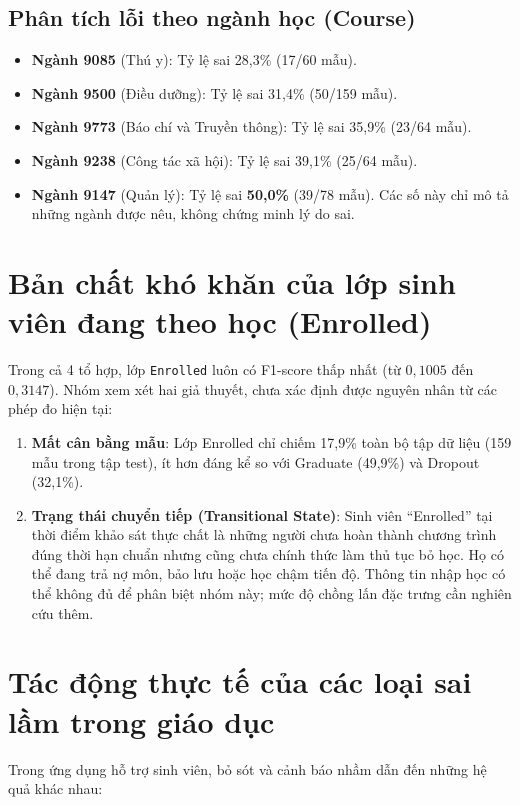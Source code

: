 \subsection{Phân tích lỗi theo ngành học (Course)}
\begin{itemize}
    \item \textbf{Ngành 9085} (Thú y): Tỷ lệ sai 28,3\% (17/60 mẫu).
    \item \textbf{Ngành 9500} (Điều dưỡng): Tỷ lệ sai 31,4\% (50/159 mẫu). 
    \item \textbf{Ngành 9773} (Báo chí và Truyền thông): Tỷ lệ sai 35,9\% (23/64 mẫu).
    \item \textbf{Ngành 9238} (Công tác xã hội): Tỷ lệ sai 39,1\% (25/64 mẫu).
    \item \textbf{Ngành 9147} (Quản lý): Tỷ lệ sai \textbf{50,0\%} (39/78 mẫu). Các số này chỉ mô tả những ngành được nêu, không chứng minh lý do sai.
\end{itemize}

\section{Bản chất khó khăn của lớp sinh viên đang theo học (Enrolled)}
Trong cả 4 tổ hợp, lớp \texttt{Enrolled} luôn có F1-score thấp nhất (từ $0{,}1005$ đến $0{,}3147$). Nhóm xem xét hai giả thuyết, chưa xác định được nguyên nhân từ các phép đo hiện tại:
\begin{enumerate}
    \item \textbf{Mất cân bằng mẫu}: Lớp Enrolled chỉ chiếm 17,9\% toàn bộ tập dữ liệu (159 mẫu trong tập test), ít hơn đáng kể so với Graduate (49,9\%) và Dropout (32,1\%).
    \item \textbf{Trạng thái chuyển tiếp (Transitional State)}: Sinh viên ``Enrolled'' tại thời điểm khảo sát thực chất là những người chưa hoàn thành chương trình đúng thời hạn chuẩn nhưng cũng chưa chính thức làm thủ tục bỏ học. Họ có thể đang trả nợ môn, bảo lưu hoặc học chậm tiến độ. Thông tin nhập học có thể không đủ để phân biệt nhóm này; mức độ chồng lấn đặc trưng cần nghiên cứu thêm.
\end{enumerate}

\section{Tác động thực tế của các loại sai lầm trong giáo dục}
Trong ứng dụng hỗ trợ sinh viên, bỏ sót và cảnh báo nhầm dẫn đến những hệ quả khác nhau:


